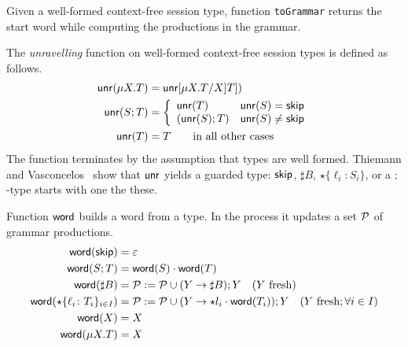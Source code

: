 %


Given a well-formed context-free session type, function
\lstinline|toGrammar| returns the start word while computing the
productions in the grammar.


The \emph{unravelling} function on well-formed context-free session
types is defined as follows.
%
\begin{align*}
  \Unravel(\mu X.T) & = \Unravel\subs{\mu X.T}XT])
  \\
  \Unravel (S;T) &= \left\{%
  \begin{array}{ll}
    \Unravel(T) & \Unravel(S) = \skipk
    \\
    (\Unravel(S); T) & \Unravel(S) \ne \skipk
  \end{array}
                        \right.
  \\
  \Unravel (T) &= T \qquad \text{in all other cases}
\end{align*}
%
The function terminates by the assumption that types are well
formed. Thiemann and Vasconcelos~\cite{thiemann2016context} show that
$\mathsf{unr}$ yields a guarded type: $\mathsf{skip}$, $\sharp B$,
$\star\{\ell_i\colon S_i\}$, or a $;$-type starts with one the these.


Function $\mathsf{word}$ builds a word from a type. In the process it updates a
set $\mathcal P$ of grammar productions.
%
\begin{align*}
  \mathsf{word}(\mathsf{skip}) &= \varepsilon
  \\
  \mathsf{word}(S;T) &= \mathsf{word}(S) \cdot \mathsf{word}(T)
  \\
  \mathsf{word}(\sharp B) &= \mathcal P := \mathcal P \cup (Y \rightarrow \sharp B); Y \quad
                   (Y\text{ fresh})
  \\
  \mathsf{word}(\star\{\ell_i\colon T_i\}_{i\in I}) &= \mathcal P := \mathcal P \cup (Y \rightarrow
                                             \star l_i\cdot \mathsf{word}(T_i)); Y \quad
                                             (Y\text{ fresh}; \forall i\in I)
  \\
  \mathsf{word}(X) &= X
  \\
  \mathsf{word}(\mu X.T) &= X
\end{align*}


